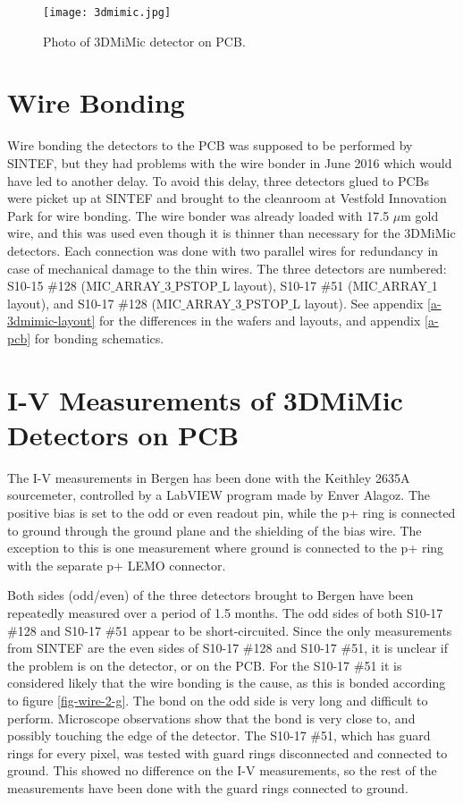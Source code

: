 \documentclass[../main/thesis.tex]{subfiles}
\begin{document}
\begin{figure}[h]
	\centering
	\texttt{[image: 3dmimic.jpg]}
	\caption{Photo of 3DMiMic detector on PCB.}
	\label{fig-3dmimic-photo}
\end{figure} 

\newpage
\section{Wire Bonding}
Wire bonding the detectors to the PCB was supposed to be performed by SINTEF, but they had problems with the wire bonder in June 2016 which would have led to another delay. To avoid this delay, three detectors glued to PCBs were picket up at SINTEF and brought to the cleanroom at Vestfold Innovation Park for wire bonding. The wire bonder was already loaded with 17.5 $\mu$m gold wire, and this was used even though it is thinner than necessary for the 3DMiMic detectors. Each connection was done with two parallel wires for redundancy in case of mechanical damage to the thin wires. The three detectors are numbered: S10-15 $\#$128 (MIC$\_$ARRAY$\_$3$\_$PSTOP$\_$L layout), S10-17 $\#$51 (MIC$\_$ARRAY$\_$1 layout), and S10-17 $\#$128 (MIC$\_$ARRAY$\_$3$\_$PSTOP$\_$L layout). See appendix \ref{a-3dmimic-layout} for the differences in the wafers and layouts, and appendix \ref{a-pcb} for bonding schematics. 

\section{I-V Measurements of 3DMiMic Detectors on PCB}
\label{3dmimic-iv-pcb}

The I-V measurements in Bergen has been done with the Keithley 2635A sourcemeter, controlled by a LabVIEW program made by Enver Alagoz. The positive bias is set to the odd or even readout pin, while the p+ ring is connected to ground through the ground plane and the shielding of the bias wire. The exception to this is one measurement where ground is connected to the p+ ring with the separate p+ LEMO connector. 

Both sides (odd/even) of the three detectors brought to Bergen have been repeatedly measured over a period of 1.5 months. The odd sides of both S10-17 \#128 and S10-17 \#51 appear to be short-circuited. Since the only measurements from SINTEF are the even sides of S10-17 \#128 and S10-17 \#51, it is unclear if the problem is on the detector, or on the \gls{PCB}. For the S10-17 \#51 it is considered likely that the wire bonding is the cause, as this is bonded according to figure \ref{fig-wire-2-g}. The bond on the odd side is very long and difficult to perform. Microscope observations show that the bond is very close to, and possibly touching the edge of the detector. The S10-17 \#51, which has guard rings for every pixel, was tested with guard rings disconnected and connected to ground. This showed no difference on the I-V measurements, so the rest of the measurements have been done with the guard rings connected to ground. 
\end{document}
